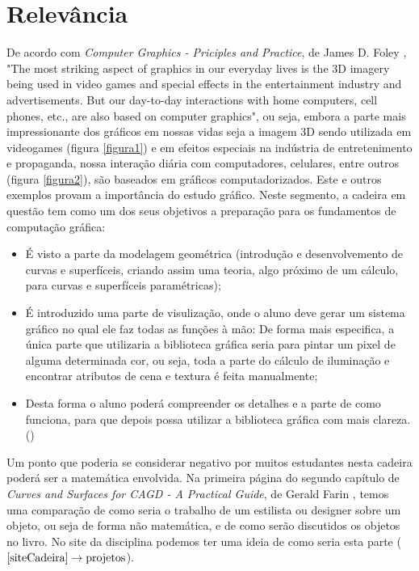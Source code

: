 \documentclass[10 pt,a4paper]{article}
\begin{document}
\section*{Relevância}
De acordo com \textit{Computer Graphics - Priciples and Practice}, de James D. Foley \cite{ComputacaoGrafica}, "The most striking aspect of graphics in our everyday lives is the 3D imagery being used in video games and special effects in the entertainment industry and advertisements. But our day-to-day interactions with home computers, cell phones, etc., are also based on computer graphics", ou seja, embora a parte mais impressionante dos gráficos em nossas vidas seja a imagem 3D sendo utilizada em videogames (figura \ref{figura1}) e em efeitos especiais na indústria de entretenimento e propaganda, nossa interação diária com computadores, celulares, entre outros (figura \ref{figura2}), são baseados em gráficos computadorizados. Este e outros exemplos provam a importância do estudo gráfico.\linebreak
Neste segmento, a cadeira em questão tem como um dos seus objetivos a preparação para os fundamentos de computação gráfica:
\begin{itemize}
\item É visto a parte da modelagem geométrica (introdução e desenvolvemento de curvas e superfíceis, criando assim uma teoria, algo próximo de um cálculo, para curvas e superfíceis paramétricas);
\item É introduzido uma parte de visulização, onde o aluno deve gerar um sistema gráfico no qual ele faz todas as funções à mão: De forma mais especifica, a única parte que utilizaria a biblioteca gráfica seria para pintar um pixel de alguma determinada cor, ou seja, toda a parte do cálculo de iluminação e encontrar atributos de cena e textura é feita manualmente;
\item Desta forma o aluno poderá compreender os detalhes e a parte de como funciona, para que depois possa utilizar a biblioteca gráfica com mais clareza.
(\cite{Silvio})
\end{itemize}
Um ponto que poderia se considerar negativo por muitos estudantes nesta cadeira poderá ser a matemática envolvida. Na primeira página do segundo capítulo de \textit{Curves and Surfaces for CAGD - A Practical Guide}, de Gerald Farin \cite{CurvaseSuperficeis}, temos uma comparação de como seria o trabalho de um estilista ou designer sobre um objeto, ou seja de forma não matemática, e de como serão discutidos os objetos no livro. No site da disciplina podemos ter uma ideia de como seria esta parte (\(\text{\cite{siteCadeira}} \rightarrow \text{projetos}\)).
\end{document}
